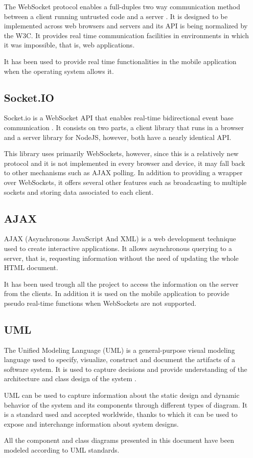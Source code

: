 The WebSocket protocol enables a full-duples two way communication method between a client running untrusted code and a server \cite{websocket}. It is designed to be implemented across web browsers and servers and its API is being normalized by the W3C. It provides real time communication facilities in environments in which it was impossible, that is, web applications.

It has been used to provide real time functionalities in the mobile application when the operating system allows it.

\subsection*{Socket.IO}

Socket.io is a WebSocket API that enables real-time bidirectional event base communication \cite{socketio}. It consists on two parts, a client library that runs in a browser and a server library for NodeJS, however, both have a nearly identical API.

This library uses primarily WebSockets, however, since this is a relatively new protocol and it is not implemented in every browser and device, it may fall back to other mechanisms such as AJAX polling. In addition to providing a wrapper over WebSockets, it offers several other features such as broadcasting to multiple sockets and storing data associated to each client.

\subsection*{AJAX}

AJAX \cite{ajax} (Asynchronous JavaScript And XML) is a web development technique used to create interactive applications. It allows asynchronous querying to a server, that is, requesting information without the need of updating the whole HTML document.

It has been used trough all the project to access the information on the server from the clients. In addition it is used on the mobile application to provide pseudo real-time functions when WebSockets are not supported.

\subsection*{UML}

The Unified Modeling Language (UML) is a general-purpose visual modeling language used to specify, visualize, construct and document the artifacts of a software system. It is used to capture decisions and provide understanding of the architecture and class design of the system \cite{uml}. 

UML can be used to capture information about the static design and dynamic behavior of the system and its components through different types of diagram. It is a standard used and accepted worldwide, thanks to which it can be used to expose and interchange information about system designs.

All the component and class diagrams presented in this document have been modeled according to UML standards.
